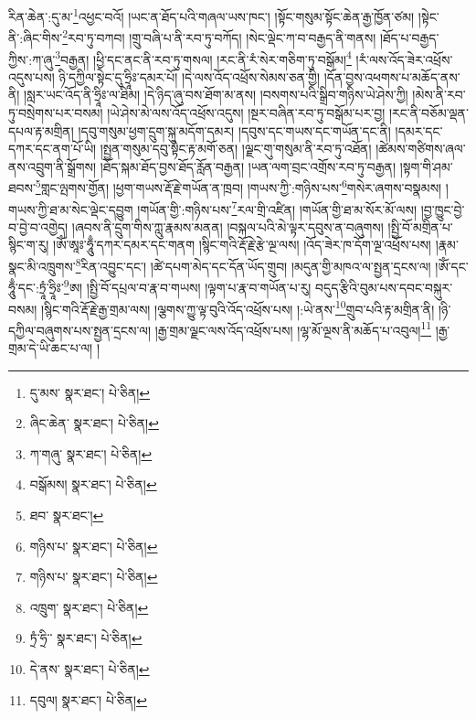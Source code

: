 རིན་ཆེན་:དུ་མ་\footnote{དུ་མས་  སྣར་ཐང་།  པེ་ཅིན། }འཕྱང་བའོ། །ཡང་ན་ཐོད་པའི་གཞལ་ཡས་ཁང་། །སྟོང་གསུམ་སྟོང་ཆེན་རྒྱ་ཁྱོན་ཙམ། །སྟེང་ནི་:ཞིང་གིས་\footnote{ཞིང་ཆེན་  སྣར་ཐང་།  པེ་ཅིན། }རབ་ཏུ་བཀབ། །གྲུ་བཞི་པ་ནི་རབ་ཏུ་བཀོད། །སེང་ལྡེང་ཀ་བ་བརྒྱད་ནི་གནས། །ཐོད་པ་བརྒྱད་ཀྱིས་:ཀ་ཞུ་\footnote{ཀ་གཞུ་  སྣར་ཐང་།  པེ་ཅིན། }བརྒྱན། །ཕྱི་དང་ནང་ནི་རབ་ཏུ་གསལ། །རང་ནི་རཾ་སེར་གཅིག་ཏུ་བསྒོམ།\footnote{བསྒོམས།  སྣར་ཐང་།  པེ་ཅིན། } །རཾ་ལས་འོད་ཟེར་འཕྲོས་འདུས་པས། ཉི་དཀྱིལ་སྟེང་དུ་ཧྲཱིཿ་དམར་པོ། །དེ་ལས་འོད་འཕྲོས་སེམས་ཅན་གྱི། །དོན་བྱས་འཕགས་པ་མཆོད་ནས་ནི། །སླར་ཡང་འོད་ནི་ཧྲཱིཿ་ལ་ཐིམ། །དེ་ཉིད་ཞུ་བས་ཐོག་མ་ནས། །བསགས་པའི་སྒྲིབ་གཉིས་ཡེ་ཤེས་ཀྱི། །མེས་ནི་རབ་ཏུ་བསྲེགས་པར་བསམ། །ཡེ་ཤེས་མེ་ལས་འོད་འཕྲོས་འདུས། །སྔར་བཞིན་རབ་ཏུ་བསྒོམ་པར་བྱ། །རང་ནི་བཅོམ་ལྡན་དཔལ་རྟ་མགྲིན། །དབུ་གསུམ་ཕྱག་དྲུག་སྐུ་མདོག་དམར། །དབུས་དང་གཡས་དང་གཡོན་དང་ནི། །དམར་དང་དཀར་དང་ནག་པོ་ཡི། །སྤྱན་གསུམ་དབུ་སྟེང་རྟ་མགོ་ཅན། །ལྗང་གུ་གསུམ་ནི་རབ་ཏུ་འཐོན། །ཚེམས་གཙིགས་ཞལ་ནས་འབྲུག་ནི་སྒྲོགས། །ཐོད་སྐམ་ཐོད་བྱས་ཐོད་རློན་བརྒྱན། །ཡན་ལག་བྲང་འགྲོས་རབ་ཏུ་བརྒྱན། །སྟག་གི་ཤམ་ཐབས་\footnote{ཐབ་  སྣར་ཐང་། }གླང་ལྤགས་གྱོན། །ཕྱག་གཡས་རྡོ་རྗེ་གཡོན་ན་ཁྲབ། །གཡས་ཀྱི་:གཉིས་པས་\footnote{གཉིས་པ་  སྣར་ཐང་།  པེ་ཅིན། }གསེར་ཞགས་བསྣམས། །གཡས་ཀྱི་ཐ་མ་སེང་ལྡེང་དབྱུག །གཡོན་གྱི་:གཉིས་པས་\footnote{གཉིས་པ་  སྣར་ཐང་།  པེ་ཅིན། }རལ་གྲི་འཛིན། །གཡོན་གྱི་ཐ་མ་སོར་མོ་ལས། །བྱ་ཁྱུང་བྱེ་བ་བྱེ་བ་འགྱེད། །ཞབས་ནི་དྲུག་གིས་ཀླུ་རྣམས་མནན། །བསྐལ་པའི་མེ་ལྟར་དབུས་ན་བཞུགས། །སྤྱི་བོ་མགྲིན་པ་སྙིང་ག་རུ། །ཨོཾ་ཨཱཿ་ཧཱུྃ་དཀར་དམར་དང་གནག །སྙིང་གའི་རྡོ་རྗེ་རྩེ་ལྔ་ལས། །འོད་ཟེར་ཁ་དོག་ལྔ་འཕྲོས་པས། །རྣམ་སྣང་མི་འཁྲུགས་\footnote{འཁྲུག་  སྣར་ཐང་།  པེ་ཅིན། }རིན་འབྱུང་དང་། །ཚེ་དཔག་མེད་དང་དོན་ཡོད་གྲུབ། །མདུན་གྱི་མཁའ་ལ་སྤྱན་དྲངས་ལ། །ཨོཾ་དང་ཧཱུྃ་དང་:ཏྲཱཾ་ཧྲཱིཿ་\footnote{ཏྲཾ་ཧྲི་་  སྣར་ཐང་།  པེ་ཅིན། }ཨ། །སྤྱི་བོ་དཔྲལ་བ་རྣ་བ་གཡས། །ལྟག་པ་རྣ་བ་གཡོན་པ་རུ། བདུད་རྩིའི་བུམ་པས་དབང་བསྐུར་བསམ། །སྙིང་གའི་རྡོ་རྗེ་རྒྱ་གྲམ་ལས། །ལྕགས་ཀྱུ་ལྟ་བུའི་འོད་འཕྲོས་པས། །:ཡེ་ནས་\footnote{དེ་ནས་  སྣར་ཐང་།  པེ་ཅིན། }གྲུབ་པའི་རྟ་མགྲིན་ནི། །ཉི་དཀྱིལ་བཞུགས་པས་སྤྱན་དྲངས་ལ། །རྒྱ་གྲམ་ལྗང་ལས་འོད་འཕྲོས་པས། །ལྷ་མོ་ལྔས་ནི་མཆོད་པ་འབུལ།\footnote{དབུལ།  སྣར་ཐང་།  པེ་ཅིན། } །རྒྱ་གྲམ་དེ་ཡི་ཆང་པ་ལ། །
